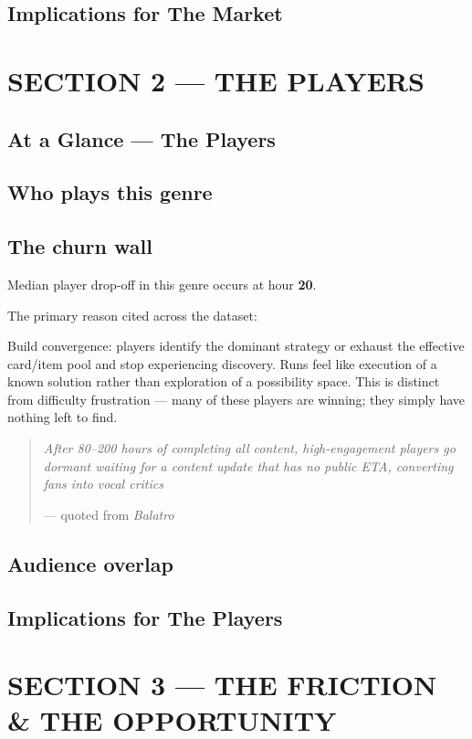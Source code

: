 \documentclass[11pt,letterpaper]{report}
\begin{document}
\chapter*{Implications for The Market}
\label{sec:orgf91575c}
\part*{SECTION 2 — THE PLAYERS}
\label{sec:org131ba25}

\chapter*{At a Glance — The Players}
\label{sec:org6ee6872}
\chapter*{Who plays this genre}
\label{sec:orga8e2359}
\chapter*{The churn wall}
\label{sec:org29005b4}
Median player drop-off in this genre occurs at hour \textbf{20}.

The primary reason cited across the dataset:

Build convergence: players identify the dominant strategy or exhaust the effective card/item pool and stop experiencing discovery. Runs feel like execution of a known solution rather than exploration of a possibility space. This is distinct from difficulty frustration — many of these players are winning; they simply have nothing left to find.

\begin{quote}
\emph{After 80–200 hours of completing all content, high-engagement players go dormant waiting for a content update that has no public ETA, converting fans into vocal critics}

— quoted from \emph{Balatro}
\end{quote}
\chapter*{Audience overlap}
\label{sec:orgfa77cc5}
\chapter*{Implications for The Players}
\label{sec:orge20c06f}
\part*{SECTION 3 — THE FRICTION \& THE OPPORTUNITY}
\label{sec:org75b7e10}
\end{document}
